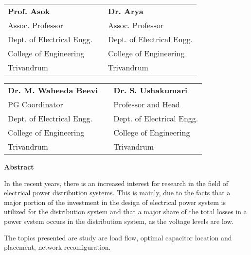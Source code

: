 \documentclass[a4paper,12pt,oneside]{report}%
\begin{document}
\begin{singlespace}
\begin{center}
\begin{tabular}{ p{6cm} p{2cm} p{6cm} }
 \textbf{Prof. Asok} && \textbf{Dr. Arya} \\
 Assoc. Professor& &Assoc. Professor\\
 Dept. of Electrical Engg. && Dept. of Electrical Engg.\\
College of Engineering & &College of Engineering\\
Trivandrum && Trivandrum\\
\end{tabular}
\end{center}

\vspace*{.50cm}
\begin{center}
\begin{tabular}{ p{6cm} p{2cm} p{6cm} }
 \textbf{Dr. M. Waheeda Beevi} && \textbf{Dr. S. Ushakumari} \\
 PG Coordinator& &Professor and Head\\
 Dept. of Electrical Engg. && Dept. of Electrical Engg.\\
College of Engineering & &College of Engineering\\
Trivandrum && Trivandrum\\
\end{tabular}
\end{center}
\end{singlespace}
\newpage
%
%
\thispagestyle{empty}

\begin{center}  {\Large \bf Abstract}\end{center}
\noindent In the recent years, there is an increased interest for research in the field of electrical power distribution systems. This is mainly, due to the facts that a major portion of the investment in the design of electrical power system is utilized for the distribution system and that a major share of the total losses in a power system occurs in the distribution system, as the voltage levels are low.
\par
The topics presented are study are load flow, optimal capacitor location and placement, network reconfiguration.
\end{document}
